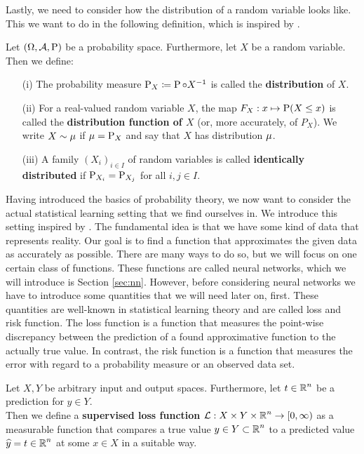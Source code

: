 Lastly, we need to consider how the distribution of a random variable looks like. This we want to do in the following definition, which is inspired by \cite[Chapter~1.5]{klenke2013probability}.

\begin{definition}\label{def:distribution}
Let $(\Omega, \operatorname{\mathcal{A}}, \operatorname{\text{P}})$ be a probability space. Furthermore, let $X$ be a random variable. Then we define:
\begin{itemize}
\item[(i)] The probability measure $\operatorname{\text{P}}_X\coloneqq \operatorname{\text{P}} \circ X^{-1}$ is called the \textbf{distribution} of $X$.
\item[(ii)] For a real-valued random variable $X$, the map $F_X: x\mapsto \operatorname{\text{P}}(X\leq x)$ is called the \textbf{distribution function of $X$} (or, more accurately, of $P_X$). We write $X\sim \operatorname{\mu}$ if $\operatorname{\mu}=\operatorname{\text{P}}_X$ and say that $X$ has distribution $\operatorname{\mu}$.
\item[(iii)] A family $(X_i)_{i\in I}$ of random variables is called \textbf{identically distributed} if $\operatorname{\text{P}}_{X_i} = \operatorname{\text{P}}_{X_j}$ for all $i,j\in I$.
\end{itemize}
\end{definition}

Having introduced the basics of probability theory, we now want to consider the actual statistical learning setting that we find ourselves in. We introduce this setting inspired by \cite[Chapter~2]{steinwart2008support}. The fundamental idea is that we have some kind of data that represents reality. Our goal is to find a function that approximates the given data as accurately as possible. There are many ways to do so, but we will focus on one certain class of functions. These functions are called neural networks, which we will introduce is Section \ref{sec:nn}. However, before considering neural networks we have to introduce some quantities that we will need later on, first. These quantities are well-known in statistical learning theory and are called loss and risk function. The loss function is a function that measures the point-wise discrepancy between the prediction of a found approximative function to the actually true value. In contrast, the risk function is a function that measures the error with regard to a probability measure or an observed data set.


\begin{definition}\label{def:loss}
Let $X,Y$ be arbitrary input and output spaces. Furthermore, let $t\in\operatorname{\mathbb{R}}^n$ be a prediction for $y\in Y$.\\
Then we define a \textbf{supervised loss function} $\operatorname{\mathcal{L}}: X \times Y \times \operatorname{\mathbb{R}}^n \to [0, \infty)$ as a measurable function that compares a true value $y \in Y \subset \operatorname{\mathbb{R}}^n$ to a predicted value $\widehat{y} = t \in\operatorname{\mathbb{R}}^{n}$ at some $x\in X$ in a suitable way.
\end{definition}

